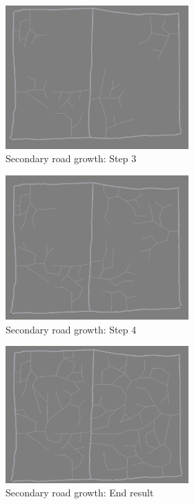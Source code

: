 \documentclass[a4paper,12pt]{scrartcl}
\begin{document}
\begin{figure}[h]
\center
\includegraphics[width=7cm]{s3.png}
\caption{Secondary road growth: Step 3}
\label{fig:sec3}
\end{figure}

\begin{figure}[h]
\center
\includegraphics[width=7cm]{s4.png}
\caption{Secondary road growth: Step 4}
\label{fig:sec4}
\end{figure}

\begin{figure}[h]
\center
\includegraphics[width=7cm]{sF.png}
\caption{Secondary road growth: End result}
\label{fig:secF}
\end{figure}
\end{document}

